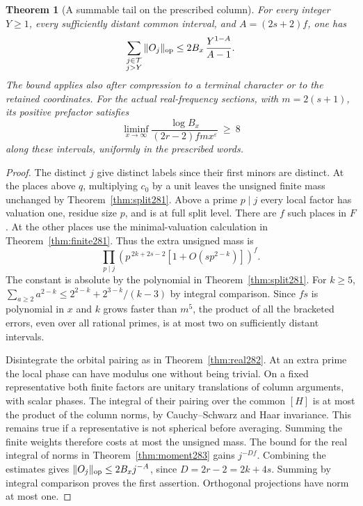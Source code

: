 \documentclass[a4paper,11pt]{article}
\newtheorem{theorem}[proposition]{Theorem}
\theoremstyle{definition}
\theoremstyle{remark}
\numberwithin{equation}{section}
\begin{document}
\begin{theorem}[A summable tail on the prescribed column]\leavevmode
\label{thm:tail283}
For every integer \(Y\ge1\), every sufficiently distant
common interval, and \(A=(2s+2)f\), one has
\[
   \sum_{\substack{j\in\mathcal T\\j>Y}}\|O_j\|_{\rm op}
                  \le 2B_x\,\frac{Y^{1-A}}{A-1}.
\]
The bound applies also after compression to a terminal
character or to the retained coordinates. For the actual
real-frequency sections, with \(m=2(s+1)\), its positive
prefactor satisfies
\[
       \liminf_{x\to\infty}
       \frac{\log B_x}{(2r-2)f m x^\varepsilon}\ \ge\ 8
\]
along these intervals, uniformly in the prescribed words.
\end{theorem}
\begin{proof}
The distinct \(j\) give distinct labels since their first
minors are distinct. At the places above \(q\), multiplying
\(c_0\) by a unit leaves the unsigned finite mass unchanged
by Theorem~\ref{thm:split281}. Above a prime \(p\mid j\)
every local factor has valuation one, residue size \(p\),
and is at full split level. There are \(f\) such places
in \(F\). At the other places use the minimal-valuation
calculation in Theorem~\ref{thm:finite281}.
Thus the extra unsigned mass is
\[
 \prod_{p\mid j}
  \left(p^{\,2k+2s-2}
            [1+O(s p^{2-k})]\right)^{\! f}.
\]
The constant is absolute by the polynomial in
Theorem~\ref{thm:split281}. For \(k\ge5\),
\(\sum_{a\ge2}a^{2-k}\le 2^{2-k}+2^{3-k}/(k-3)\)
by integral comparison. Since \(fs\) is polynomial in \(x\)
and \(k\) grows faster than \(m^5\), the product of all the
bracketed errors, even over all rational primes, is at most
two on sufficiently distant intervals.

Disintegrate the orbital pairing as in
Theorem~\ref{thm:real282}. At an extra prime the local
phase can have modulus one without being trivial. On a
fixed representative both finite factors are unitary
translations of column arguments, with scalar phases.
The integral of their pairing over the common \([H]\)
is at most the product of the column norms, by
Cauchy--Schwarz and Haar invariance. This remains true
if a representative is not spherical before averaging.
Summing the finite weights therefore costs at most the
unsigned mass. The bound for the real integral of norms
in Theorem~\ref{thm:moment283} gains \(j^{-Df}\).
Combining the estimates gives
\(\|O_j\|_{\rm op}\le2B_x j^{-A}\), since
\(D=2r-2=2k+4s\). Summing by integral comparison proves
the first assertion. Orthogonal projections have norm at
most one.


\end{proof}
\end{document}
